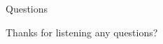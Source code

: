 \begin{frame}{Questions}
\begin{center}
Thanks for listening any questions?    
\end{center}{}
\end{frame}